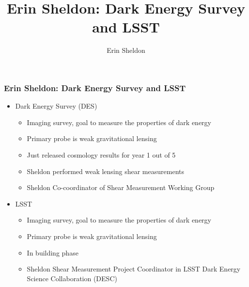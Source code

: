 \documentclass{beamer}
\title{Erin Sheldon: Dark Energy Survey and LSST}
\author{Erin Sheldon}
\institute{Brookhaven National Laboratory}
\begin{document}




\frame
{
    \frametitle{Erin Sheldon: Dark Energy Survey and LSST}


    \begin{itemize}

        \item Dark Energy Survey (DES)
            \begin{itemize}
                \item Imaging survey, goal to measure the properties of dark energy
                \item Primary probe is weak gravitational lensing
                \item Just released cosmology results for year 1 out of 5
                \item Sheldon performed weak lensing shear measurements
                \item Sheldon {\color{gold} Co-coordinator of Shear Measurement Working Group}
            \end{itemize}

        \item LSST
             \begin{itemize}
                \item Imaging survey, goal to measure the properties of dark energy
                \item Primary probe is weak gravitational lensing
                \item In building phase
                \item Sheldon {\color{gold} Shear Measurement Project Coordinator} in LSST Dark Energy Science Collaboration (DESC)
            \end{itemize}

    \end{itemize}

}
\end{document}
